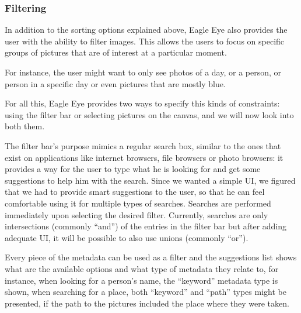 \subsubsection{Filtering} %
\label{ss:filtering}

In addition to the sorting options explained above, Eagle Eye also provides the user with the ability to filter images. This allows the users to focus on specific groups of pictures that are of interest at a particular moment.

For instance, the user might want to only see photos of a day, or a person, or person in a specific day or even pictures that are mostly blue.

For all this, Eagle Eye provides two ways to specify this kinds of constraints: using the filter bar or selecting pictures on the canvas, and we will now look into both them.

The filter bar's purpose mimics a regular search box, similar to the ones that exist on applications like internet browsers, file browsers or photo browsers: it provides a way for the user to type what he is looking for and get some suggestions to help him with the search. Since we wanted a simple \ac{UI}, we figured that we had to provide smart suggestions to the user, so that he can feel comfortable using it for multiple types of searches. Searches are performed immediately upon selecting the desired filter. Currently, searches are only intersections (commonly ``and'') of the entries in the filter bar but after adding adequate \ac{UI}, it will be possible to also use unions (commonly ``or'').

Every piece of the metadata can be used as a filter and the suggestions list shows what are the available options and what type of metadata they relate to, for instance, when looking for a person's name, the ``keyword'' metadata type is shown, when searching for a place, both ``keyword'' and ``path'' types might be presented, if the path to the pictures included the place where they were taken.

